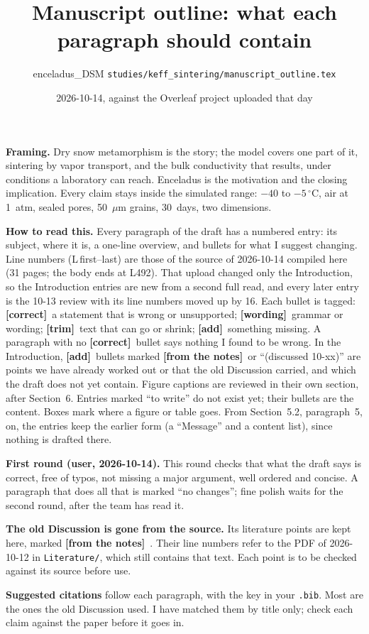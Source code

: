 \documentclass[11pt]{article}
\title{Manuscript outline: what each paragraph should contain}
\author{enceladus\_DSM \quad \texttt{studies/keff\_sintering/manuscript\_outline.tex}}
\date{2026-10-14, against the Overleaf project uploaded that day}
\newcommand{\Note}{\textcolor{open}{\textbf{[from the notes]}}\ }
\newcommand{\tC}{\textcolor{miss}{\textbf{[correct]}}\ }
\newcommand{\tG}{\textcolor{stale}{\textbf{[wording]}}\ }
\newcommand{\tT}{\textcolor{cut}{\textbf{[trim]}}\ }
\newcommand{\tA}{\textcolor{have}{\textbf{[add]}}\ }
\begin{document}
\maketitle

\textbf{Framing.} Dry snow metamorphism is the story; the model covers one
part of it, sintering by vapor transport, and the bulk conductivity that
results, under conditions a laboratory can reach. Enceladus is the motivation
and the closing implication. Every claim stays inside the simulated range:
$-40$ to $-5\,^{\circ}$C, air at 1~atm, sealed pores, 50~$\mu$m grains,
30~days, two dimensions.

\textbf{How to read this.} Every paragraph of the draft has a numbered
entry: its subject, where it is, a one-line overview, and bullets for what I
suggest changing. Line numbers (L\,first--last) are those of the source of
2026-10-14 compiled here (31 pages; the body ends at L492). That upload
changed only the Introduction, so the Introduction entries are new from a
second full read, and every later entry is the 10-13 review with its line
numbers moved up by 16. Each bullet is tagged:
\tC a statement that is wrong or unsupported;
\tG grammar or wording;
\tT text that can go or shrink;
\tA something missing.
A paragraph with no \tC bullet says nothing I found to be wrong. In the
Introduction, \tA bullets marked \Note or ``(discussed 10-xx)'' are points we
have already worked out or that the old Discussion carried, and which the
draft does not yet contain. Figure captions are reviewed in their own
section, after Section~6. Entries
marked ``to write'' do not exist yet; their bullets are the content. Boxes
mark where a figure or table goes. From Section~5.2, paragraph~5, on, the
entries keep the earlier form (a ``Message'' and a content list), since
nothing is drafted there.

\textbf{First round (user, 2026-10-14).} This round checks that what the
draft says is correct, free of typos, not missing a major argument, well
ordered and concise. A paragraph that does all that is marked ``no changes'';
fine polish waits for the second round, after the team has read it.

\textbf{The old Discussion is gone from the source.} Its literature points
are kept here, marked \Note. Their line numbers refer to the PDF of
2026-10-12 in \texttt{Literature/}, which still contains that text. Each
point is to be checked against its source before use.

\textbf{Suggested citations} follow each paragraph, with the key in your
\texttt{.bib}. Most are the ones the old Discussion used. I have matched them
by title only; check each claim against the paper before it goes in.
\end{document}
